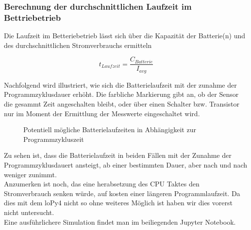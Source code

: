 \subsubsection{Berechnung der durchschnittlichen Laufzeit im Bettriebetrieb}

Die Laufzeit im Betteriebetrieb lässt sich über die Kapazität der Batterie(n) und des durchschnittlichen Stromverbrauchs ermitteln

\[t_{Laufzeit} = \frac{C_{Batterie}}{I_{avg}}\]

Nachfolgend wird illustriert, wie sich die Batterielaufzeit mit der zunahme der Programmzyklusdauer erhöht. Die farbliche Markierung gibt an, ob der Sensor die gesammt Zeit angeschalten bleibt, oder über einen Schalter bzw. Transistor nur im Moment der Ermittlung der Messwerte eingeschaltet wird.

\begin{center}
	\begin{figure}[h]
	 
	 \noindent{}
	 \caption[Potentiell mögliche Batterielaufzeiten in Abhängigkeit zur Programmzykluszeit]{Potentiell mögliche Batterielaufzeiten in Abhängigkeit zur Programmzykluszeit}
	 \label{fig:batterielaufzeit}
	\end{figure}
\end{center}

Zu sehen ist, dass die Batterielaufzeit in beiden Fällen mit der Zunahme der Programmzyklusdauert ansteigt, ab einer bestimmten Dauer, aber nach und nach weniger zunimmt.\\
Anzumerken ist noch, das eine herabsetzung des CPU Taktes den Stromverbrauch senken würde, auf kosten einer längeren Programmlaufzeit. Da dies mit dem loPy4 nicht so ohne weiteres Möglich ist haben wir dies vorerst nicht untersucht.\\
Eine ausführlichere Simulation findet man im beiliegenden Jupyter Notebook.\cite{schimmel}

\newpage
